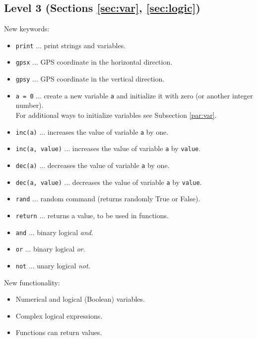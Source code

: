 \subsection{Level 3 (Sections \ref{sec:var}, \ref{sec:logic})}

New keywords:
\begin{itemize}
\item {\tt print} ... print strings and variables.
\item {\tt gpsx} ... GPS coordinate in the horizontal direction.
\item {\tt gpsy} ... GPS coordinate in the vertical direction.
\item {\tt a = 0} ... create a new variable {\tt a} and initialize it with zero (or another 
      integer number).\\ For additional ways to initialize variables see Subsection \ref{par:var}.
\item {\tt inc(a)} ... increases the value of variable {\tt a} by one.
\item {\tt inc(a, value)} ... increases the value of variable {\tt a} by {\tt value}.
\item {\tt dec(a)} ... decreases the value of variable {\tt a} by one.
\item {\tt dec(a, value)} ... decreases the value of variable {\tt a} by {\tt value}.
\item {\tt rand} ... random command (returns randomly True or False).
\item {\tt return} ... returns a value, to be used in functions.
\item {\tt and} ... binary logical {\em and}.
\item {\tt or} ... binary logical {\em or}.
\item {\tt not} ... unary logical {\em not}.
\end{itemize}
New functionality:
\begin{itemize}
\item Numerical and logical (Boolean) variables.
\item Complex logical expressions.
\item Functions can return values.
\end{itemize}
